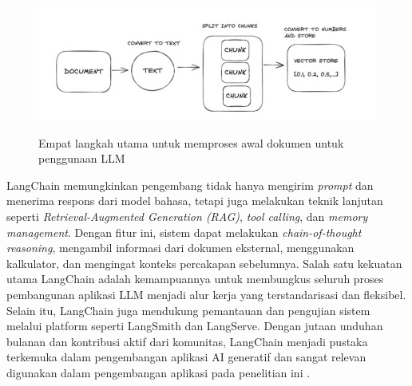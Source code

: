 \begin{figure}[htbp]
  \centering
  \includegraphics[width=0.85\linewidth]{images/bab-2/llm-process.png}
  \caption{Empat langkah utama untuk memproses awal dokumen untuk penggunaan LLM}\label{fig:langchain-pipeline}\citep{bagui2023database}
\end{figure}
\singlespacing{}
LangChain memungkinkan pengembang tidak hanya mengirim \textit{prompt} dan menerima respons dari model bahasa, tetapi juga melakukan teknik lanjutan seperti \textit{Retrieval-Augmented Generation (RAG)}, \textit{tool calling}, dan \textit{memory management}. Dengan fitur ini, sistem dapat melakukan \textit{chain-of-thought reasoning}, mengambil informasi dari dokumen eksternal, menggunakan kalkulator, dan mengingat konteks percakapan sebelumnya.
\singlespacing{}
Salah satu kekuatan utama LangChain adalah kemampuannya untuk membungkus seluruh proses pembangunan aplikasi LLM menjadi alur kerja yang terstandarisasi dan fleksibel. Selain itu, LangChain juga mendukung pemantauan dan pengujian sistem melalui platform seperti LangSmith dan LangServe.
\singlespacing{}
Dengan jutaan unduhan bulanan dan kontribusi aktif dari komunitas, LangChain menjadi pustaka terkemuka dalam pengembangan aplikasi AI generatif dan sangat relevan digunakan dalam pengembangan aplikasi pada penelitian ini \citep{oshin2024learning}.